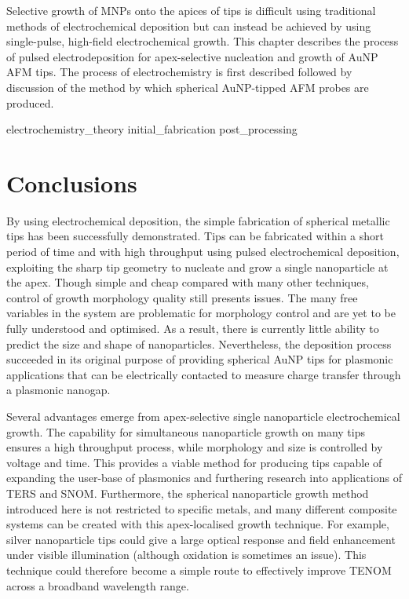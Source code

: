 \documentclass[12pt, a4paper, oneside]{book}
\begin{document}
Selective growth of MNPs onto the apices of tips is difficult using traditional methods of electrochemical deposition but can instead be achieved by using single-pulse, high-field electrochemical growth. This chapter describes the process of pulsed electrodeposition for apex-selective nucleation and growth of AuNP AFM tips. The process of electrochemistry is first described followed by discussion of the method by which spherical AuNP-tipped AFM probes are produced.

{electrochemistry_theory}
{initial_fabrication}
{post_processing}

\section{Conclusions}

By using electrochemical deposition, the simple fabrication of spherical metallic tips has been successfully demonstrated. Tips can be fabricated within a short period of time and with high throughput using pulsed electrochemical deposition, exploiting the sharp tip geometry to nucleate and grow a single nanoparticle at the apex. Though simple and cheap compared with many other techniques, control of growth morphology quality still presents issues. The many free variables in the system are problematic for morphology control and are yet to be fully understood and optimised. As a result, there is currently little ability to predict the size and shape of nanoparticles. Nevertheless, the deposition process succeeded in its original purpose of providing spherical AuNP tips for plasmonic applications that can be electrically contacted to measure charge transfer through a plasmonic nanogap.

Several advantages emerge from apex-selective single nanoparticle electrochemical growth. The capability for simultaneous nanoparticle growth on many tips ensures a high throughput process, while morphology and size is controlled by voltage and time. This provides a viable method for producing tips capable of expanding the user-base of plasmonics and furthering research into applications of TERS and SNOM. Furthermore, the spherical nanoparticle growth method introduced here is not restricted to specific metals, and many different composite systems can be created with this apex-localised growth technique. For example, silver nanoparticle tips could give a large optical response and field enhancement under visible illumination (although oxidation is sometimes an issue). This technique could therefore become a simple route to effectively improve TENOM across a broadband wavelength range.

\ifstandalone
\begin{singlespace}
\fontsize{8pt}{1em}\selectfont
\printbibliography[notcategory=fullcited]
\end{singlespace}
\fi
\end{document}

